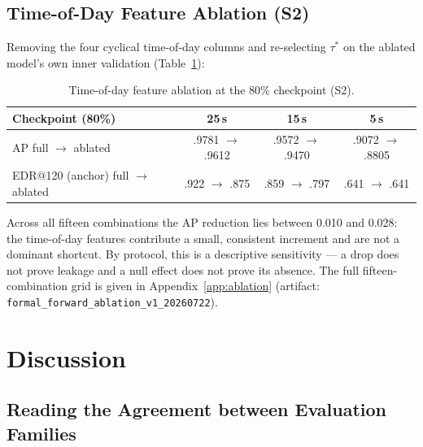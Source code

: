 \documentclass[runningheads]{llncs}
\begin{document}
\subsection{Time-of-Day Feature Ablation (S2)}\label{sec:ablation}

Removing the four cyclical time-of-day columns and re-selecting
$\tau^{*}$ on the ablated model's own inner validation
(Table~\ref{tab:ablation}):

\begin{table}[t]
\centering
\caption{Time-of-day feature ablation at the 80\% checkpoint (S2).}
\label{tab:ablation}
\footnotesize
\setlength{\tabcolsep}{3pt}
\begin{tabular}{lccc}
\toprule
Checkpoint (80\%) & 25\,s & 15\,s & 5\,s \\
\midrule
AP full $\rightarrow$ ablated & .9781 $\rightarrow$ .9612 & .9572 $\rightarrow$ .9470 & .9072 $\rightarrow$ .8805 \\
EDR@120 (anchor) full $\rightarrow$ ablated & .922 $\rightarrow$ .875 & .859 $\rightarrow$ .797 & .641 $\rightarrow$ .641 \\
\bottomrule
\end{tabular}
\end{table}

Across all fifteen combinations the AP reduction lies between 0.010 and
0.028: the time-of-day features contribute a small, consistent
increment and are not a dominant shortcut. By protocol, this is a
descriptive sensitivity --- a drop does not prove leakage and a null
effect does not prove its absence. The full fifteen-combination grid is
given in Appendix~\ref{app:ablation} (artifact:
\texttt{formal\_forward\_ablation\_v1\_20260722}).

\section{Discussion}\label{sec:discussion}

\subsection{Reading the Agreement between Evaluation
Families}\label{sec:agreement}
\end{document}
